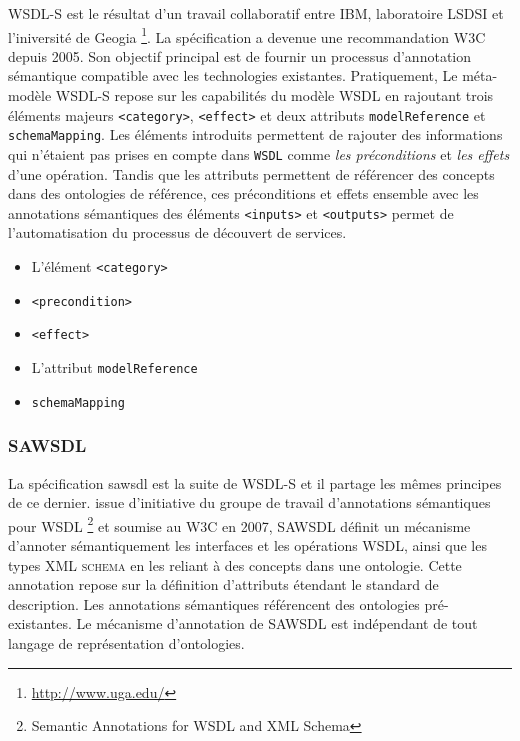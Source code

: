 	    \textsc{WSDL-S} \cite{akkiraju2005web} est le résultat d'un travail collaboratif entre IBM, 
	    laboratoire LSDSI et l'iniversité de Geogia \footnote{\url{http://www.uga.edu/}}. 
	    La spécification a devenue une recommandation \textsc{W3C} 
	    depuis 2005. Son objectif principal est de fournir un processus d'annotation sémantique compatible avec 
	    les technologies existantes. Pratiquement, Le méta-modèle \textsc{WSDL-S} repose sur les capabilités 
	    du modèle \textsc{WSDL} en rajoutant trois éléments majeurs \texttt{<category>}, \texttt{<effect>} 
	    et deux attributs \texttt{modelReference} et \texttt{schemaMapping}. Les éléments introduits 
	    permettent de rajouter des informations qui n'étaient pas prises en compte dans \texttt{WSDL} comme 
	    \emph{les préconditions} et \emph{les effets} d'une opération. Tandis que les attributs permettent 
	    de référencer des concepts dans des ontologies de référence, ces préconditions et effets ensemble
	    avec les annotations sémantiques des éléments \texttt{<inputs>} et \texttt{<outputs>} permet de
	    l'automatisation du processus de découvert de services.


	    \begin{itemize} %
		\item L'élément \texttt{<category>}
		\item \texttt{<precondition>}
		\item \texttt{<effect>}
		\item L'attribut \texttt{modelReference}
		\item \texttt{schemaMapping}
	    \end{itemize}

	    \subsubsection{SAWSDL}	    

	    La spécification \acrshort{sawsdl} \cite{kopecky2007sawsdl} est la suite de \textsc{WSDL-S} et il partage 
	    les mêmes principes de ce dernier. issue d'initiative du groupe de travail d'annotations sémantiques pour 
	    \textsc{WSDL} \footnote{Semantic Annotations for WSDL and XML Schema} et soumise au \textsc{W3C}
	    en 2007, \textsc{SAWSDL} définit un mécanisme d'annoter sémantiquement les interfaces et les opérations 
	    \textsc{WSDL}, ainsi que les types \textsc{XML schema} en les reliant à des concepts dans une ontologie.
	    Cette annotation repose sur la définition d'attributs étendant le standard de description. 
	    Les annotations sémantiques référencent des ontologies pré-existantes. Le mécanisme d'annotation 
	    de \textsc{SAWSDL} est indépendant de tout langage de représentation \cite{lopez2008selection} 
	    d'ontologies.

